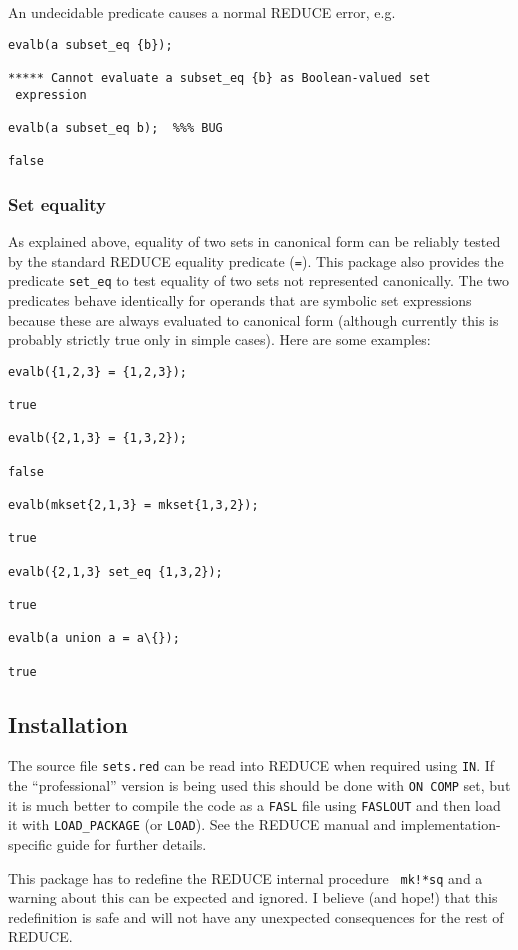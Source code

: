 An undecidable predicate causes a normal REDUCE error, e.g.
\begin{verbatim}
evalb(a subset_eq {b});

***** Cannot evaluate a subset_eq {b} as Boolean-valued set
 expression

evalb(a subset_eq b);  %%% BUG

false
\end{verbatim}


\subsubsection{Set equality}

As explained above, equality of two sets in canonical form can be
reliably tested by the standard REDUCE equality predicate ({\tt =}).
This package also provides the predicate {\tt set\_eq} to test
equality of two sets not represented canonically.  The two predicates
behave identically for operands that are symbolic set expressions
because these are always evaluated to canonical form (although
currently this is probably strictly true only in simple cases).  Here
are some examples:
\begin{verbatim}
evalb({1,2,3} = {1,2,3});

true

evalb({2,1,3} = {1,3,2});

false

evalb(mkset{2,1,3} = mkset{1,3,2});

true

evalb({2,1,3} set_eq {1,3,2});

true

evalb(a union a = a\{});

true
\end{verbatim}


\subsection{Installation}

The source file {\tt sets.red} can be read into REDUCE when required
using {\tt IN}.  If the ``professional'' version is being used this
should be done with {\tt ON COMP} set, but it is much better to
compile the code as a {\tt FASL} file using {\tt FASLOUT} and then
load it with {\tt LOAD\_PACKAGE} (or {\tt LOAD}).  See the REDUCE
manual and implementation-specific guide for further details.

This package has to redefine the REDUCE internal procedure {\tt
mk!*sq} and a warning about this can be expected and ignored.  I
believe (and hope!) that this redefinition is safe and will not have
any unexpected consequences for the rest of REDUCE.


